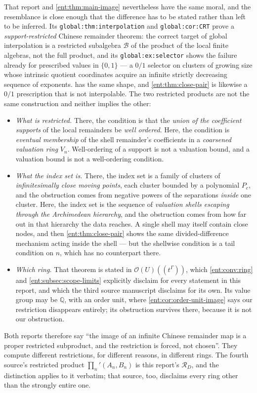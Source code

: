 \documentclass[11pt]{article}
\theoremstyle{plain}
\theoremstyle{plain}
\theoremstyle{plain}
\theoremstyle{definition}
\theoremstyle{definition}
\theoremstyle{definition}
\theoremstyle{definition}
\theoremstyle{remark}
\newcommand{\Q}{\mathbb Q}\newcommand{\Z}{\mathbb Z}\newcommand{\N}{\mathbb N}
\newcommand{\RD}{\mathcal R_D}\newcommand{\Ucal}{\mathcal U}
\begin{document}
That report and \cref{ent:thm:main-image} nevertheless have the same moral,
and the resemblance is close enough that the difference has to be stated
rather than left to be inferred. Its \texttt{global:thm:interpolation} and
\texttt{global:cor:CRT} prove a \emph{support-restricted} Chinese remainder
theorem: the correct target of global interpolation is a restricted
subalgebra $\mathcal B$ of the product of the local finite algebras, not the
full product, and its \texttt{global:ex:selector} shows the failure already
for prescribed values in $\{0,1\}$ --- a $0/1$ selector on clusters of
growing size whose intrinsic quotient coordinates acquire an infinite
strictly decreasing sequence of exponents.  has the
same shape, and \cref{ent:thm:close-pair} is likewise a $0/1$ prescription
that is not interpolable. The two restricted products are not the same
construction and neither implies the other:
\begin{itemize}[leftmargin=1.4em]
\item \emph{What is restricted.} There, the condition is that the
\emph{union of the coefficient supports} of the local remainders be
\emph{well ordered}. Here, the condition is \emph{eventual membership} of the
shell remainder's coefficients in a \emph{coarsened valuation ring} $V_n$.
Well-ordering of a support is not a valuation bound, and a valuation bound is
not a well-ordering condition.
\item \emph{What the index set is.} There, the index set is a family of
clusters of \emph{infinitesimally close moving points}, each cluster bounded
by a polynomial $P_c$, and the obstruction comes from negative powers of the
separations \emph{inside} one cluster. Here, the index set is the sequence of
\emph{valuation shells escaping through the Archimedean hierarchy}, and the
obstruction comes from how far out in that hierarchy the data reaches. A
single shell may itself contain close nodes, and then
\cref{ent:thm:close-pair} shows the same divided-difference mechanism acting
inside the shell --- but the shellwise condition is a tail condition on
$n$, which has no counterpart there.
\item \emph{Which ring.} That theorem is stated in
$\mathcal O(U)((t^\Gamma))$, which \cref{ent:conv:ring} and
\cref{ent:subsec:scope-limits} explicitly disclaim for every statement in
this report, and which the third source manuscript disclaims for its own. Its
value group may be $\Q$, with an order unit, where
\cref{ent:cor:order-unit-image} says our restriction disappears entirely;
its obstruction survives there, because it is not our obstruction.
\end{itemize}
Both reports therefore say ``the image of an infinite Chinese remainder map
is a proper restricted subproduct, and the restriction is forced, not
chosen''. They compute different restrictions, for different reasons, in
different rings. The fourth source's restricted product
$\prod_n'(A_n,B_n)$ is this report's $\RD$, and the distinction applies to
it verbatim; that source, too, disclaims every ring other than the strongly
entire one.
\end{document}
